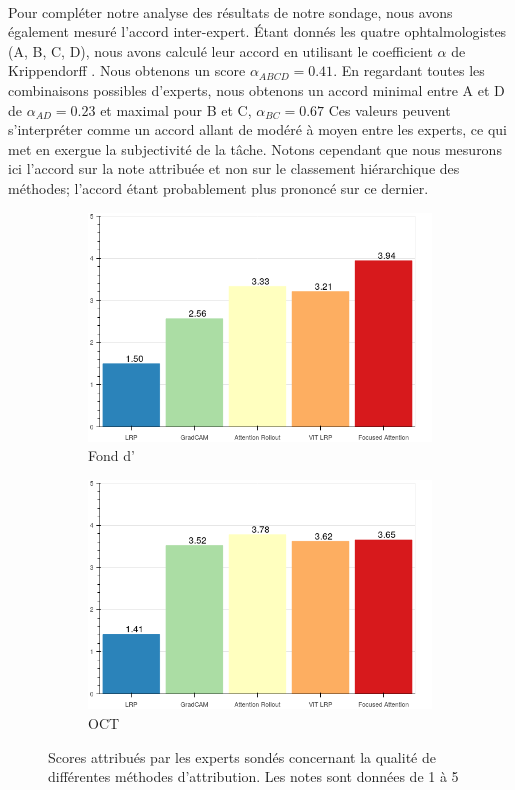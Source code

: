 \\
Pour compléter notre analyse des résultats de notre sondage, nous avons également mesuré l'accord inter-expert. Étant donnés les quatre ophtalmologistes (A, B, C, D), nous avons calculé leur accord en utilisant le coefficient $\alpha$ de Krippendorff \cite{shelley_krippendorff_1984}. Nous obtenons un score $\alpha_{ABCD}=0.41$. En regardant toutes les combinaisons possibles d'experts, nous obtenons un accord minimal entre A et D de $\alpha_{AD}=0.23$ et maximal pour B et C, $\alpha_{BC}=0.67$ Ces valeurs peuvent s'interpréter comme un accord allant de modéré à moyen entre les experts, ce qui met en exergue la subjectivité de la tâche. Notons cependant que nous mesurons ici l'accord sur la note attribuée et non sur le classement hiérarchique des méthodes; l'accord étant probablement plus prononcé sur ce dernier.
\begin{figure}[!h]
	\centering
	\begin{subfigure}{0.48\textwidth}
	\includegraphics[width=\linewidth]{gnuplot/focused_attention/survey/fundus_score}
	\caption{Fond d'\oeil}
	\label{fig:fundusscore}
	\end{subfigure}
	\begin{subfigure}{0.48\textwidth}
		\includegraphics[width=\linewidth]{gnuplot/focused_attention/survey/oct_score}
		\caption{OCT}
		\label{fig:octscore}
	\end{subfigure}
	\caption{Scores attribués par les experts sondés concernant la qualité de différentes méthodes d'attribution. Les notes sont données de 1 à 5}
	\label{fig:ScoreAttributions}
\end{figure}
